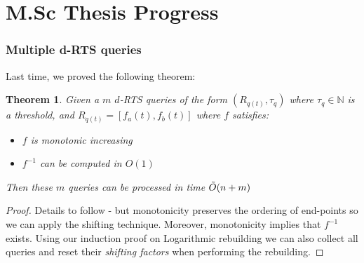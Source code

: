 \documentclass{article}
\newtheorem{theorem}{Theorem}[section]
\begin{document}
\hspace{95mm}

\section*{M.Sc Thesis Progress}

\subsubsection*{Multiple d-RTS queries}

Last time, we proved the following theorem: 

\begin{theorem}
    Given a $m$ $d$-RTS queries of the form     $(R_{q(t)}, \tau_q)$ where $\tau_q \in \mathbb{N}$
    is a threshold, and $R_{q(t)} =[f_a(t), f_b(t)]$ where $f$ satisfies: 
    \begin{itemize}
        \item $f$ is monotonic increasing
        \item $f^{-1}$ can be computed in $O(1)$
    \end{itemize}
    Then these $m$ queries can be processed in time $\Tilde{O}(n+m)$
\end{theorem}
\begin{proof}
    Details to follow - but monotonicity preserves the ordering of end-points so we can apply the shifting technique. Moreover, monotonicity implies that $f^{-1}$ exists.
    Using our induction proof on Logarithmic rebuilding we can also collect all queries and reset their \textit{shifting factors} when performing the rebuilding. 
\end{proof}
\end{document}
